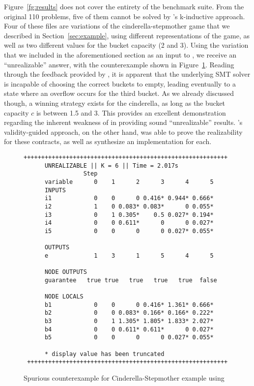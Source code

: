 
Figure~\ref{fg:results} does not cover the entirety of the
benchmark suite. From the original 110 problems, five of them cannot be
solved by \jsyn's k-inductive approach. Four of these files are variations of
the cinderella-stepmother game that we described in Section~\ref{sec:example}, using different representations of the game, as well as two different values
for the bucket capacity (2 and 3). Using the variation that we included in the
aforementioned section as an input to \jsyn, we receive an ``unrealizable'' answer, with the counterexample shown
in Figure~\ref{fg:cex}. Reading through the feedback provided by \jsyn, it is
apparent that the underlying SMT solver is incapable of choosing the correct
buckets to empty, leading eventually to a state where an overflow occurs for the
third bucket. As we already discussed though, a winning strategy exists for the
cinderella, as long as the bucket capacity $c$ is between 1.5 and 3. This
provides an excellent demonstration regarding the inherent weakness of \jsyn
in providing sound ``unrealizable'' results. \jsynvg's validity-guided approach,
on the other hand, was able to prove the realizability for these contracts, as
well as synthesize an implementation for each.

\begin{figure}[!t]
\centering
 \begin{Verbatim}[fontsize=\scriptsize]
 ++++++++++++++++++++++++++++++++++++++++++++++++++++++++++
      UNREALIZABLE || K = 6 || Time = 2.017s
                 Step
      variable      0    1      2      3      4      5
      INPUTS
      i1            0    0      0 0.416* 0.944* 0.666*
      i2            1    0 0.083* 0.083*      0 0.055*
      i3            0    1 0.305*    0.5 0.027* 0.194*
      i4            0    0 0.611*      0      0 0.027*
      i5            0    0      0      0 0.027* 0.055*

      OUTPUTS
      e             1    3      1      5      4      5

      NODE OUTPUTS
      guarantee   true true   true   true   true  false

      NODE LOCALS
      b1            0    0      0 0.416* 1.361* 0.666*
      b2            0    0 0.083* 0.166* 0.166* 0.222*
      b3            0    1 1.305* 1.805* 1.833* 2.027*
      b4            0    0 0.611* 0.611*      0 0.027*
      b5            0    0      0      0 0.027* 0.055*

      * display value has been truncated
 +++++++++++++++++++++++++++++++++++++++++++++++++++++++++
 \end{Verbatim}
\caption{Spurious counterexample for Cinderella-Stepmother example using \jsyn}

\label{fg:cex}
\end{figure}

